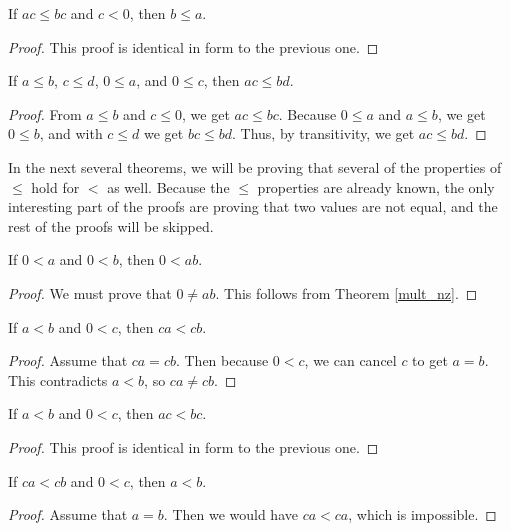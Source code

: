 \documentclass[../math.tex]{subfiles}
\begin{document}
\begin{theorem} \label{le_mult_rcancel_neg}
    If $ac \leq bc$ and $c < 0$, then $b \leq a$.
\end{theorem}
\begin{proof}
    This proof is identical in form to the previous one.
\end{proof}

\begin{theorem} \label{le_lrmult_pos}
    If $a \leq b$, $c \leq d$, $0 \leq a$, and $0 \leq c$, then $ac \leq bd$.
\end{theorem}
\begin{proof}
    From $a \leq b$ and $c \leq 0$, we get $ac \leq bc$.  Because $0 \leq a$ and
    $a \leq b$, we get $0 \leq b$, and with $c \leq d$ we get $bc \leq bd$.
    Thus, by transitivity, we get $ac \leq bd$.
\end{proof}

In the next several theorems, we will be proving that several of the properties
of $\leq$ hold for $<$ as well.  Because the $\leq$ properties are already
known, the only interesting part of the proofs are proving that two values are
not equal, and the rest of the proofs will be skipped.

\begin{theorem}
    If $0 < a$ and $0 < b$, then $0 < ab$.
\end{theorem}
\begin{proof}
    We must prove that $0 \neq ab$.  This follows from Theorem \ref{mult_nz}.
\end{proof}

\begin{theorem}
    If $a < b$ and $0 < c$, then $ca < cb$.
\end{theorem}
\begin{proof}
    Assume that $ca = cb$.  Then because $0 < c$, we can cancel $c$ to get $a =
    b$.  This contradicts $a < b$, so $ca \neq cb$.
\end{proof}

\begin{theorem}
    If $a < b$ and $0 < c$, then $ac < bc$.
\end{theorem}
\begin{proof}
    This proof is identical in form to the previous one.
\end{proof}

\begin{theorem}
    If $ca < cb$ and $0 < c$, then $a < b$.
\end{theorem}
\begin{proof}
    Assume that $a = b$.  Then we would have $ca < ca$, which is impossible.
\end{proof}
\end{document}
